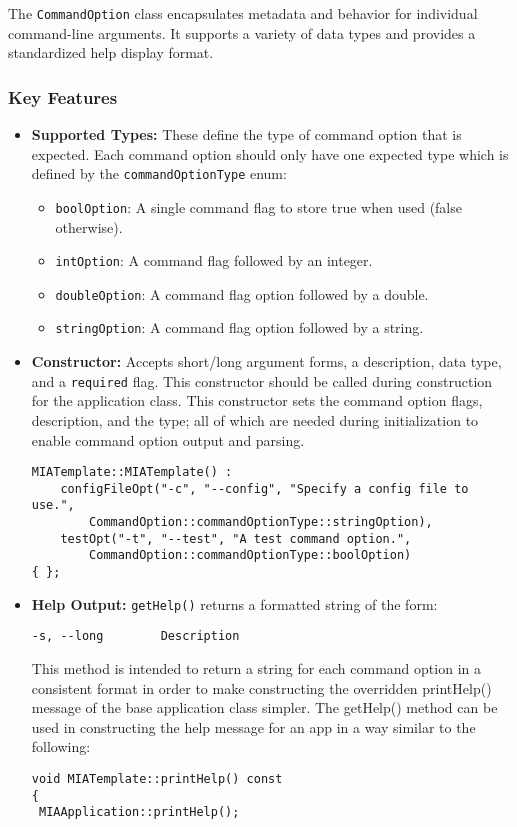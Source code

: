 The \texttt{CommandOption} class encapsulates metadata and behavior for individual command-line arguments. It supports a variety of data types and provides a standardized help display format.

\subsubsection*{Key Features}
\begin{itemize}
	\item \textbf{Supported Types:} These define the type of command option that is expected. Each command option should only have one expected type which is defined by the \texttt{commandOptionType} enum:
	\begin{itemize}
		\item \texttt{boolOption}: A single command flag to store true when used (false otherwise).
		\item \texttt{intOption}: A command flag followed by an integer.
		\item \texttt{doubleOption}: A command flag option followed by a double.
		\item \texttt{stringOption}: A command flag option followed by a string.
	\end{itemize}
	
	\item \textbf{Constructor:} Accepts short/long argument forms, a description, data type, and a \texttt{required} flag. This constructor should be called during construction for the application class. This constructor sets the command option flags, description, and the type; all of which are needed during initialization to enable command option output and parsing.
	\begin{lstlisting}[style=cppstyle]
MIATemplate::MIATemplate() : 
    configFileOpt("-c", "--config", "Specify a config file to use.",
        CommandOption::commandOptionType::stringOption),
    testOpt("-t", "--test", "A test command option.",
        CommandOption::commandOptionType::boolOption)            
{ };
	\end{lstlisting}
	
	\item \textbf{Help Output:} \texttt{getHelp()} returns a formatted string of the form:
	\begin{lstlisting}
-s, --long        Description
	\end{lstlisting}
	This method is intended to return a string for each command option in a consistent format in order to make constructing the overridden printHelp() message of the base application class simpler. The getHelp() method can be used in constructing the help message for an app in a way similar to the following:
	\begin{lstlisting}[style=cppstyle]
void MIATemplate::printHelp() const
{
 MIAApplication::printHelp();
 

\end{lstlisting}
\end{itemize}
